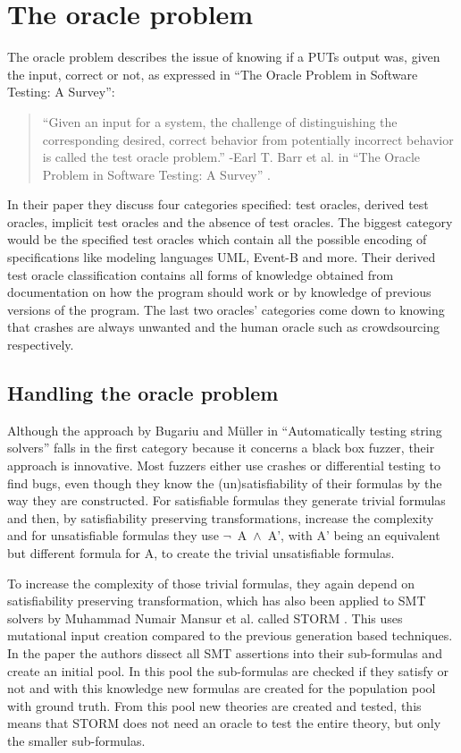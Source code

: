 \section{The oracle problem}
\label{fuzzing:OracleProblem}
The oracle problem describes the issue of knowing if a PUTs output was, given the input, correct or not, as expressed in “The Oracle Problem in Software Testing: A Survey”: 
\begin{quote}
	“Given an input for a system, the challenge of distinguishing the corresponding desired, correct behavior from potentially incorrect behavior is called the test oracle problem.”
	\newline
	-Earl T. Barr et al. in “The Oracle Problem in Software Testing: A Survey” \cite{10barr2014oracleProblem}.
\end{quote}
In their paper they discuss four categories specified: test oracles, derived test oracles, implicit test oracles and the absence of test oracles. The biggest category would be the specified test oracles which contain all the possible encoding of specifications like modeling languages UML, Event-B and more. Their derived test oracle classification contains all forms of knowledge obtained from documentation on how the program should work or by knowledge of previous versions of the program. The last two oracles’ categories come down to knowing that crashes are always unwanted and the human oracle such as crowdsourcing respectively.

\subsection{Handling the oracle problem}
\label{fuzzing:handelingOracelproblem}
Although the approach by Bugariu and M\"uller in “Automatically testing string solvers” \cite{9bugariu2020automaticallyTestingStringSolvers} falls in the first category because it concerns a black box fuzzer, their approach is innovative. Most fuzzers either use crashes or differential testing to find bugs, even though they know the (un)satisfiability of their formulas by the way they are constructed. For satisfiable formulas they generate trivial formulas and then, by satisfiability preserving transformations, increase the complexity and for unsatisfiable formulas they use \mbox{$\neg$ A $\land$ A'}, with A' being an equivalent but different formula for A, to create the trivial unsatisfiable formulas. 

To increase the complexity of those trivial formulas, they again depend on satisfiability preserving transformation, which has also been applied to SMT solvers by Muhammad Numair Mansur et al. called STORM \cite{1mansur2020detecting}. This uses mutational input creation compared to the previous generation based techniques. In the paper the authors dissect all SMT assertions into their sub-formulas and create an initial pool. In this pool the sub-formulas are checked if they satisfy or not and with this knowledge new formulas are created for the population pool with ground truth. From this pool new theories are created and tested, this means that STORM does not need an oracle to test the entire theory, but only the smaller sub-formulas.



